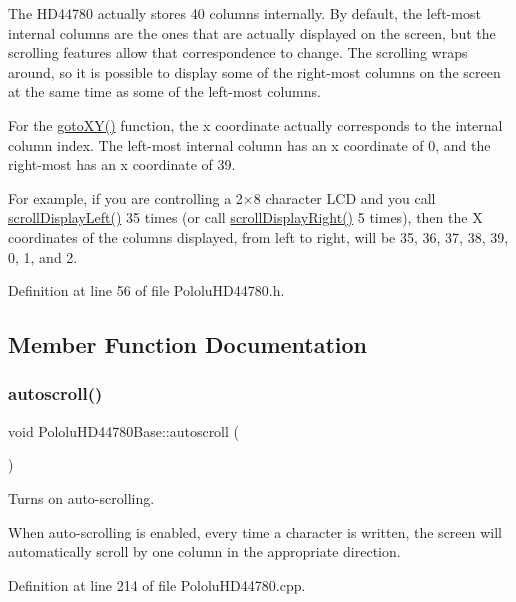 The H\+D44780 actually stores 40 columns internally. By default, the left-\/most internal columns are the ones that are actually displayed on the screen, but the scrolling features allow that correspondence to change. The scrolling wraps around, so it is possible to display some of the right-\/most columns on the screen at the same time as some of the left-\/most columns.

For the \hyperlink{class_pololu_h_d44780_base_a4886df8c888669cf71675072689ace9b}{goto\+X\+Y()} function, the x coordinate actually corresponds to the internal column index. The left-\/most internal column has an x coordinate of 0, and the right-\/most has an x coordinate of 39.

For example, if you are controlling a 2{$\times$}8 character L\+CD and you call \hyperlink{class_pololu_h_d44780_base_aada34a47663585f60b70e1d6f936f6d3}{scroll\+Display\+Left()} 35 times (or call \hyperlink{class_pololu_h_d44780_base_a411512707f303af75de3c5aea313bf48}{scroll\+Display\+Right()} 5 times), then the X coordinates of the columns displayed, from left to right, will be 35, 36, 37, 38, 39, 0, 1, and 2. 

Definition at line 56 of file Pololu\+H\+D44780.\+h.



\subsection{Member Function Documentation}
\mbox{\label{class_pololu_h_d44780_base_ad5104d9651fd95704d1ae192073b0d61}} 
\subsubsection{\texorpdfstring{autoscroll()}{autoscroll()}}
{\footnotesize\ttfamily void Pololu\+H\+D44780\+Base\+::autoscroll (\begin{DoxyParamCaption}{ }\end{DoxyParamCaption})}

Turns on auto-\/scrolling.

When auto-\/scrolling is enabled, every time a character is written, the screen will automatically scroll by one column in the appropriate direction. 

Definition at line 214 of file Pololu\+H\+D44780.\+cpp.

